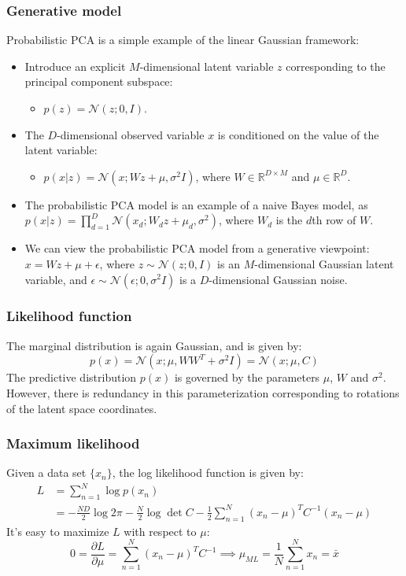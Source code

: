 \documentclass{beamer}
\begin{document}
\begin{frame}
    \frametitle{Generative model}
    Probabilistic PCA is a simple example of the linear Gaussian framework:
    \begin{itemize}
        \item Introduce an explicit $M$-dimensional latent variable $z$ corresponding to the principal component subspace:
        \begin{itemize}
            \item $p(z)=\mathcal{N}(z;0,I)$.
        \end{itemize}
        \item The $D$-dimensional observed variable $x$ is conditioned on the value of the latent variable:
        \begin{itemize}
            \item $p(x|z)=\mathcal{N}(x;Wz+\mu,\sigma^{2}I)$, where $W\in\mathbb{R}^{D\times{}M}$ and $\mu\in\mathbb{R}^{D}$.
        \end{itemize}
        \item The probabilistic PCA model is an example of a naive Bayes model, as $p(x|z)=\prod_{d=1}^{D}\mathcal{N}(x_{d};W_{d}z+\mu_{d},\sigma^{2})$, where $W_{d}$ is the $d$th row of $W$.
        \item We can view the probabilistic PCA model from a generative viewpoint: $x=Wz+\mu+\epsilon$, where $z\sim\mathcal{N}(z;0,I)$ is an $M$-dimensional Gaussian latent variable, and $\epsilon\sim\mathcal{N}(\epsilon;0,\sigma^{2}I)$ is a $D$-dimensional Gaussian noise.
    \end{itemize}
\end{frame}

\begin{frame}
    \frametitle{Likelihood function}
    The marginal distribution is again Gaussian, and is given by:
    \begin{equation*}
        p(x)=\mathcal{N}(x;\mu,WW^{T}+\sigma^{2}I)=\mathcal{N}(x;\mu,C)
    \end{equation*}
    The predictive distribution $p(x)$ is governed by the parameters $\mu$, $W$ and $\sigma^{2}$. However, there is redundancy in this parameterization corresponding to rotations of the latent space coordinates.
\end{frame}

\begin{frame}
    \frametitle{Maximum likelihood}
    Given a data set $\{x_{n}\}$, the log likelihood function is given by:
    \begin{align*}
        L&=\sum_{n=1}^{N}\log{}p(x_{n}) \\
        &=-\frac{ND}{2}\log{}2\pi-\frac{N}{2}\log\det{}C-\frac{1}{2}\sum_{n=1}^{N}(x_{n}-\mu)^{T}C^{-1}(x_{n}-\mu)
    \end{align*}
    It's easy to maximize $L$ with respect to $\mu$:
    \begin{equation*}
        0=\frac{\partial{}L}{\partial\mu}=\sum_{n=1}^{N}(x_{n}-\mu)^{T}C^{-1}\implies\mu_{ML}=\frac{1}{N}\sum_{n=1}^{N}x_{n}=\bar{x}
    \end{equation*}
\end{frame}
\end{document}
